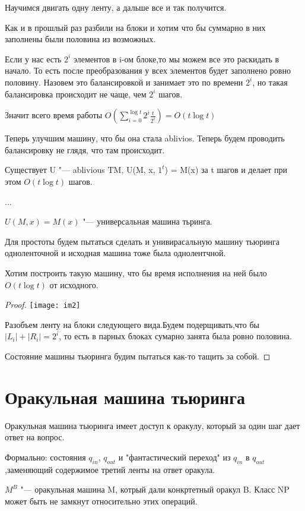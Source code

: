Научимся двигать одну ленту, а дальше все и так получится. 

Как и в прошлый раз разбили на блоки и хотим что бы суммарно в них заполнены были половина из 
возможных. 

Если у нас есть $2^i$ элементов в i-ом блоке,то мы можем все это раскидать в начало. 
То есть после преобразования у всех элементов будет заполнено ровно половину. Назовем это
балансировкой и занимает это по времени $2^i$, но такая балансировка происходит 
не чаще, чем $2^i$ шагов. 

Значит всего время работы $O(\sum_{i = 0}^{\log t}2^i \frac{t}{2^i}) = O(t\log t)$

Теперь улучшим машину, что бы она стала ablivios. Теперь будем проводить 
балансировку не глядя, что там происходит. 

\begin{lemma}
Существует U "--- ablivious TM, U(M, x, $1^t$) = M(x) за t шагов и 
делает при этом $O(t\log t)$ шагов. 
\end{lemma}
\begin{conseq}
...
\end{conseq}



\begin{Def}
$U(M, x) = M(x)$ "--- универсальная машина тьринга.
\end{Def}

Для простоты будем пытаться сделать и унивирасальную машину тьюринга одноленточной и исходная 
машина тоже была однолентчной. 

\begin{theorem}
Хотим построить такую машину, что бы время исполнения на ней было $O(t \log t)$ от исходного. 
\end{theorem}

\begin{proof}
\texttt{[image: im2]}

Разобъем ленту на блоки следующего вида.Будем подерщивать,что бы $|L_i| + |R_i| = 2^i$, 
то есть в парных блоках сумарно занята была ровно половина. 

Состояние машины тьюринга будим пытаться как-то тащить за собой. 
\end{proof}

\section{Оракульная машина тьюринга}
Оракульная машина тьюринга имеет доступ к оракулу, который за один шаг
дает ответ на вопрос. 

Формально: состояния $q_{in}$, $q_{out}$  и "фантастический переход" из 
$q_{in}$ в $q_{out}$,заменяющий содержимое третий ленты на ответ оракула. 

$M^B$ "--- оракульная машина M, котрый дали конкртетный оракул B. Класс NP может 
быть не замкнут относительно этих операций. 